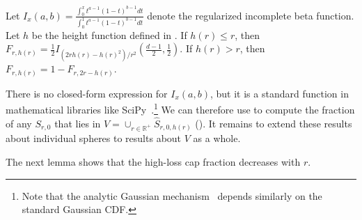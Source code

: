\begin{lemma}[\cite{L10}]
\label{lem:cap_fraction}
    Let $I_x(a,b) = \frac{\int_0^xt^{a-1}(1-t)^{b-1} dt}{\int_0^1 t^{a-1}(1-t)^{b-1}dt}$ denote the regularized incomplete beta function. Let $h$ be the height function defined in . If $h(r) \leq r$, then $F_{r,h(r)} = \frac{1}{2}I_{(2rh(r)-h(r)^2)/r^2}\left(\frac{d-1}{2}, \frac{1}{2}\right)$. If $h(r) > r$, then $F_{r,h(r)} = 1 - F_{r,2r-h(r)}$.
\end{lemma}

There is no closed-form expression for $I_x(a,b)$, but it is a standard function in mathematical libraries like SciPy~\cite{S24}.\footnote{Note that the analytic Gaussian mechanism~\cite{BW18} depends similarly on the standard Gaussian CDF.} We can therefore use  to compute the fraction of any $S_{r,0}$ that lies in $V = \cup_{r \in \mathbb{R}^{+}}\hat S_{r,0,h(r)}$ (). It remains to extend these results about individual spheres to results about $V$ as a whole.

The next lemma shows that the high-loss cap fraction decreases with $r$. 

